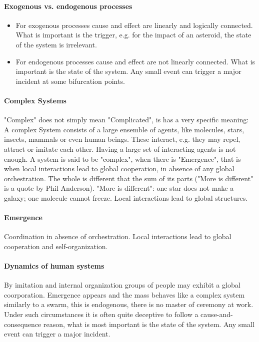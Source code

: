 \paragraph{Exogenous vs. endogenous processes}
\begin{itemize}
    \item For exogenous processes cause and effect are linearly and logically
        connected. What is important is the trigger, e.g. for the impact of
        an asteroid, the state of the system is irrelevant.
    \item For endogenous processes cause and effect are not linearly connected.
        What is important is the state of the system. Any small event can
        trigger a major incident at some bifurcation points.
\end{itemize}

\paragraph{Complex Systems}
"Complex" does not simply mean "Complicated", is has a very specific meaning:
A complex System consists of a large ensemble of agents, like molecules,
stars, insects, mammals or even human beings. These interact, e.g. they may
repel, attract or imitate each other. Having a large set of interacting
agents is not enough. A system is said to be "complex", when there is
"Emergence", that is when local interactions lead to global cooperation,
in absence of any global orchestration. The whole is different that the sum
of its parts ("More is different" is a quote by Phil Anderson). "More is
different": one star does not make a galaxy; one molecule cannot freeze.
Local interactions lead to global structures.

\paragraph{Emergence}
Coordination in absence of orchestration. Local interactions lead to global
cooperation and self-organization.

\paragraph{Dynamics of human systems}
By imitation and internal organization groups of people may exhibit a global
coorporation. Emergence appears and the mass behaves like a complex system
similarly to a swarm, this is endogenous, there is no master of ceremony at work.
Under such circumstances it is often quite deceptive to follow a cause-and-consequence
reason, what is most important is the state of the system. Any small event can
trigger a major incident.
